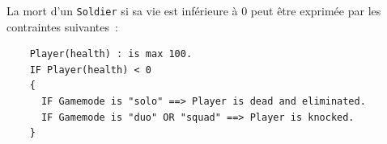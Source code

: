 La mort d'un \texttt{Soldier} si sa vie est inférieure à 0 peut être exprimée par les contraintes suivantes~:
{
\footnotesize
\begin{framed}
\begin{verbatim}
    Player(health) : is max 100.
    IF Player(health) < 0
    {
      IF Gamemode is "solo" ==> Player is dead and eliminated.
      IF Gamemode is "duo" OR "squad" ==> Player is knocked.
    }
\end{verbatim}
\end{framed}
}

